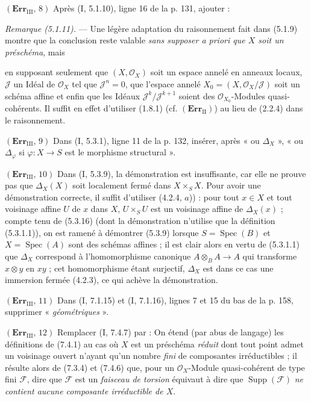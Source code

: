 \noindent\textbf{$(\mathbf{Err}_{\mathrm{III}},\,8)$} Après (I, 5.1.10),
ligne 16 de la p. 131, ajouter :

\emph{Remarque (5.1.11).} --- Une légère adaptation du raisonnement fait dans
(5.1.9) montre que la conclusion reste valable \emph{sans supposer a priori
que $X$ soit un préschéma}, mais

en supposant seulement que $(X,\mathscr O_X)$ soit un espace annelé en anneaux
locaux, $\mathscr J$ un Idéal de $\mathscr O_X$ tel que $\mathscr J^n=0$, que
l'espace annelé $X_0=(X,\mathscr O_X/\mathscr J)$ soit un schéma affine et enfin
que les Idéaux $\mathscr J^k/\mathscr J^{k+1}$ soient des
$\mathscr O_{X_0}$-Modules quasi-cohérents. Il suffit en effet d'utiliser
(1.8.1) (cf. $(\mathbf{Err}_{\mathrm{II}})$) au lieu de (2.2.4) dans le
raisonnement.

\noindent\textbf{$(\mathbf{Err}_{\mathrm{III}},\,9)$} Dans (I, 5.3.1), ligne
11 de la p. 132, insérer, après « ou $\Delta_X$ », « ou $\Delta_\varphi$ si
$\varphi:X\to S$ est le morphisme structural ».

\noindent\textbf{$(\mathbf{Err}_{\mathrm{III}},\,10)$} Dans (I, 5.3.9), la
démonstration est insuffisante, car elle ne prouve pas que $\Delta_X(X)$ soit
localement fermé dans $X\times_SX$. Pour avoir une démonstration correcte, il
suffit d'utiliser (4.2.4, $a$)) : pour tout $x\in X$ et tout voisinage affine
$U$ de $x$ dans $X$, $U\times_SU$ est un voisinage affine de $\Delta_X(x)$ ;
compte tenu de (5.3.16) (dont la démonstration n'utilise que la définition
(5.3.1.1)), on est ramené à démontrer (5.3.9) lorsque
$S=\operatorname{Spec}(B)$ et $X=\operatorname{Spec}(A)$ sont des schémas
affines ; il est clair alors en vertu de (5.3.1.1) que $\Delta_X$ correspond à
l'homomorphisme canonique $A\otimes_BA\to A$ qui transforme $x\otimes y$ en
$xy$ ; cet homomorphisme étant surjectif, $\Delta_X$ est dans ce cas une
immersion fermée (4.2.3), ce qui achève la démonstration.

\noindent\textbf{$(\mathbf{Err}_{\mathrm{III}},\,11)$} Dans (I, 7.1.15) et
(I, 7.1.16), lignes 7 et 15 du bas de la p. 158, supprimer
« \emph{géométriques} ».

\noindent\textbf{$(\mathbf{Err}_{\mathrm{III}},\,12)$} Remplacer (I, 7.4.7)
par : On étend (par abus de langage) les définitions de (7.4.1) au cas où
$X$ est un préschéma \emph{réduit} dont tout point admet un voisinage ouvert
n'ayant qu'un nombre \emph{fini} de composantes irréductibles ; il résulte
alors de (7.3.4) et (7.4.6) que, pour un $\mathscr O_X$-Module quasi-cohérent de
type fini $\mathscr F$, dire que $\mathscr F$ est un \emph{faisceau de torsion}
équivaut à dire que $\operatorname{Supp}(\mathscr F)$ \emph{ne contient aucune
composante irréductible de $X$}.

